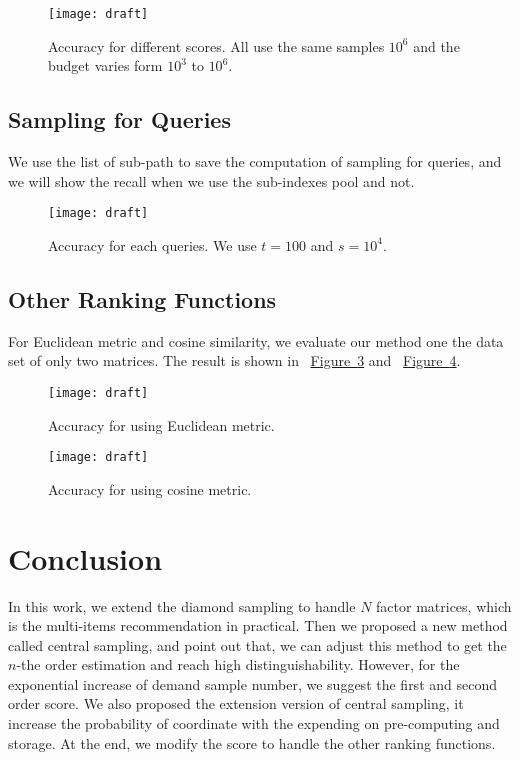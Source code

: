 \documentclass[letterpaper]{article}
\newcommand{\Fig}[1] {\hyperref[fig:#1] {Figure~\ref*{fig:#1}}} %
\begin{document}
\begin{figure}[ht]
  \centering
  \texttt{[image: draft]}\\
  \caption{Accuracy for different scores. All use the same samples $10^6$ and the budget varies form $10^3$ to $10^6$.}
  \label{fig:Isotonicity}
\end{figure}

\subsection{Sampling for Queries}
We use the list of sub-path to save the computation of sampling for queries, and we will show the recall when we use the sub-indexes pool and not.





\begin{figure}[ht]
  \centering
  \texttt{[image: draft]}\\
  \caption{Accuracy for each queries. We use $t=100$ and $s=10^4$.}
  \label{fig:Queries}
\end{figure}


\subsection{Other Ranking Functions}
For Euclidean metric and cosine similarity, we evaluate our method one the data set of only two matrices. The result is shown in ~\Fig{EuclideanMetric} and ~\Fig{Cosine}.

\begin{figure}[H]
  \centering
  \texttt{[image: draft]}\\
  \caption{Accuracy for using Euclidean metric.}
  \label{fig:EuclideanMetric}
\end{figure}

\begin{figure}[H]
  \centering
  \texttt{[image: draft]}\\
  \caption{Accuracy for using cosine metric.}
  \label{fig:Cosine}
\end{figure}


\section{Conclusion}

In this work, we extend the diamond sampling to handle $N$ factor matrices, which is the multi-items recommendation in practical. Then we proposed a new method called central sampling, and point out that, we can adjust this method to get the $n$-the order estimation and reach high distinguishability. However, for the exponential increase of demand sample number, we suggest the first and second order score. We also proposed the extension version of central sampling, it increase the probability of coordinate with the expending on pre-computing and storage. At the end, we modify the score to handle the other ranking functions.



\end{document}

